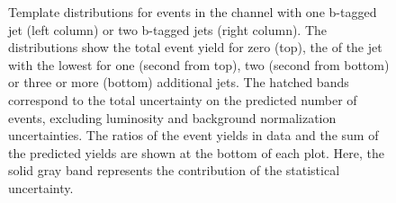 \begin{figure}[htbp!]
\begin{center}
\caption{Template distributions for events in the \mumu channel with one b-tagged jet (left column) or two b-tagged jets (right column). The distributions show the total event yield for zero (top), the \pt of the jet with the lowest \pt  for one (second from top),
  two (second from bottom) or three or more (bottom) additional jets. 
  The hatched bands correspond to the total uncertainty on the predicted number of events, excluding luminosity and background
        normalization uncertainties.  The ratios of the event yields in data and the sum of the
  predicted yields are shown at the bottom of each plot. Here, the solid
  gray band represents the contribution of the statistical uncertainty.  
       \label{fig:xsec_mumu_inputdistr}}
  \end{center}
\end{figure}

